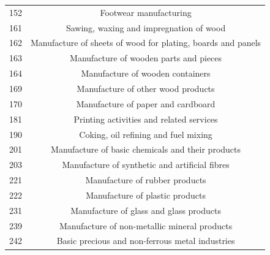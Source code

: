 \documentclass[12pt,a4paper]{article}
\begin{document}
{\begin{longtable}{@{}lc@{}}
	152                                            & Footwear manufacturing                                                   \\
	161                                            & Sawing, waxing and impregnation   of wood                                \\
	162                                            & Manufacture of sheets of wood   for plating, boards and panels           \\
	163                                            & Manufacture of wooden parts and   pieces                                 \\
	164                                            & Manufacture of wooden containers                                         \\
	169                                            & Manufacture of other wood   products                                     \\
	170                                            & Manufacture of paper and   cardboard                                     \\
	181                                            & Printing activities and related   services                               \\
	190                                            & Coking, oil refining and fuel   mixing                                   \\
	201                                            & Manufacture of basic chemicals   and their products                      \\
	203                                            & Manufacture of synthetic and   artificial fibres                         \\
	221                                            & Manufacture of rubber products                                           \\
	222                                            & Manufacture of plastic products                                          \\
	231                                            & Manufacture of glass and glass   products                                \\
	239                                            & Manufacture of non-metallic   mineral products                           \\
	242                                            & Basic precious and non-ferrous   metal industries                        \\

\end{longtable}}
\end{document}
